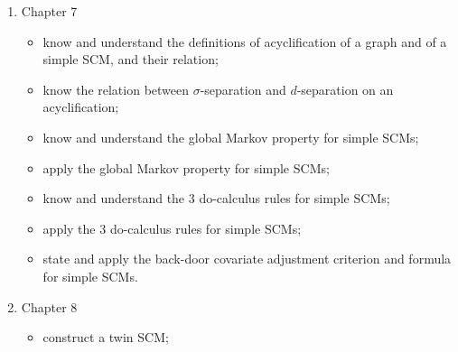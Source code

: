 \begin{enumerate}
\begin{itemize}
    \item understand the different equivalence relations for SCMs (see also Chapter 8);
    \item know and understand the definition of marginalization of SCMs;
    \item construct a marginalized SCM;
    \item know and apply the basic commutation and compatibility properties of basic operations on SCMs (intervening, marginalization, preservation of unique solvability / simplicity / equivalence);
    \item know and understand the definition of the graph of an SCM;
    \item be able to draw the graph of a given SCM, and to construct an SCM with a given graph;
    \item know and apply the basic compatibility relations between the operation that maps an SCM to a graph and other basic SCM operations;
    \item give a causal interpretation of the graph of an SCM (see Chapter 9);
    \item know the definition of acyclic SCM;
    \item understand and appreciate the differences between different causal model classes.
  \end{itemize}
  \item Chapter 7
    \begin{itemize}
      \item know and understand the definitions of acyclification of a graph and of a simple SCM, and their relation;
      \item know the relation between $\sigma$-separation and $d$-separation on an acyclification;
      \item know and understand the global Markov property for simple SCMs;
      \item apply the global Markov property for simple SCMs;
      \item know and understand the 3 do-calculus rules for simple SCMs;
      \item apply the 3 do-calculus rules for simple SCMs;
      \item state and apply the back-door covariate adjustment criterion and formula for simple SCMs.
    \end{itemize}
  \item Chapter 8
    \begin{itemize}
      \item construct a twin SCM;

\end{itemize}
\end{enumerate}
